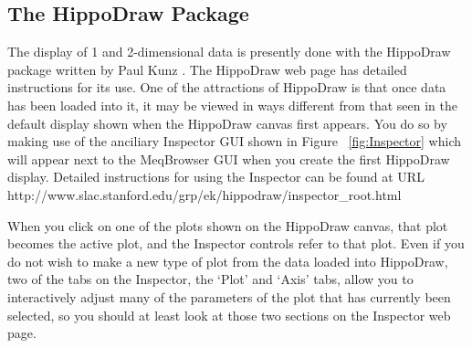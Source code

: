 \documentclass[10pt]{article}
\begin{document}
\subsection {The HippoDraw Package}

The display of 1 and 2-dimensional data is presently done with the
HippoDraw package written by Paul Kunz \cite{kunz}. The HippoDraw web 
page \cite{kunz} has
detailed instructions for its use. One of the attractions 
of HippoDraw is that once data has been loaded into it, it may be 
viewed in ways different from that seen in the default display
shown when the HippoDraw canvas first appears. You do so by making
use of the anciliary Inspector GUI shown in Figure  ~\ref{fig:Inspector} which
will appear next to the MeqBrowser GUI when you create 
the first HippoDraw display. Detailed instructions for using
the Inspector can be found at 
URL http://www.slac.stanford.edu/grp/ek/hippodraw/inspector\_root.html

When you click on one of the plots shown on the HippoDraw canvas,
that plot becomes the active plot, and the Inspector controls
refer to that plot. 
Even if you do not wish to make a new type of plot from the
data loaded into HippoDraw, two of the tabs on the Inspector, the
`Plot' and `Axis' tabs, allow you to interactively adjust many of the
parameters of the plot that has currently been selected, so you
should at least look at those two sections on the Inspector  
web page.
\end{document}

